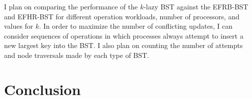 \documentclass[letterpaper]{article}
\begin{document}
I plan on comparing the performance of the $k$-lazy BST against the EFRB-BST and EFHR-BST for different operation workloads, number of processors, and values for $k$. In order to maximize the number of conflicting updates, I can consider sequences of operations in which processes always attempt to insert a new largest key into the BST. I also plan on counting the number of attempts and node traversals made by each type of BST.

\section{Conclusion}\label{section_conclusion}


\end{document}
